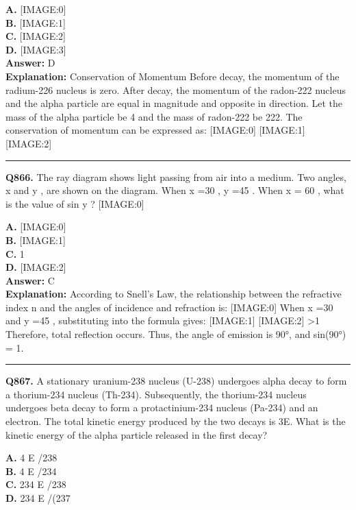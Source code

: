 \documentclass[12pt]{article}
\begin{document}
\textbf{A.} [IMAGE:0] \\
\textbf{B.} [IMAGE:1] \\
\textbf{C.} [IMAGE:2] \\
\textbf{D.} [IMAGE:3] \\

\textbf{Answer:} D \\
\textbf{Explanation:} Conservation of Momentum
Before decay, the momentum of the radium-226 nucleus is zero. After decay, the momentum of the radon-222 nucleus and the alpha particle are equal in magnitude and opposite in direction. Let the mass of the alpha particle be 4 and the mass of radon-222 be 222. The conservation of momentum can be expressed as:
[IMAGE:0]
[IMAGE:1]
[IMAGE:2]

\hrule
\vspace{1em}


\noindent
\textbf{Q866.} The ray diagram shows light passing from air into a medium. Two angles,
x
and
y
, are shown on the diagram. When
x
=30
\circ 
,
y
=45
\circ 
. When
x
=
60
\circ 
, what is the value of sin
y
?
[IMAGE:0]



\textbf{A.} [IMAGE:0] \\
\textbf{B.} [IMAGE:1] \\
\textbf{C.} 1 \\
\textbf{D.} [IMAGE:2] \\

\textbf{Answer:} C \\
\textbf{Explanation:} According to Snell's Law, the relationship between the refractive index
n
and the angles of incidence and refraction is:
[IMAGE:0]
When
x
=30
\circ 
and
y
=45
\circ 
, substituting into the formula gives:
[IMAGE:1]
[IMAGE:2]
>1 Therefore, total reflection occurs. Thus, the angle of emission is 90°, and sin(90°) = 1.

\hrule
\vspace{1em}


\noindent
\textbf{Q867.} A stationary uranium-238 nucleus (U-238) undergoes alpha decay to form a thorium-234 nucleus (Th-234). Subsequently, the thorium-234 nucleus undergoes beta decay to form a protactinium-234 nucleus (Pa-234) and an electron. The total kinetic energy produced by the two decays is 3E. What is the kinetic energy of the alpha particle released in the first decay?



\textbf{A.} 4
E
​/238 \\
\textbf{B.} 4
E
​/234 \\
\textbf{C.} 234
E
​/238 \\
\textbf{D.} 234
E
​/(237 \\
\end{document}
